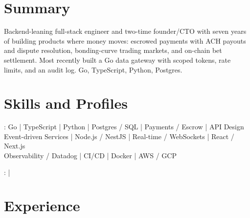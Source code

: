 \documentclass[print]{jack-resume}
\begin{document}
\pagecolor{darkmodeBackground}


\begin{minipage}[t][1cm][t]{.03\textwidth}
    \hfill
\end{minipage}

\section{Summary}
Backend-leaning full-stack engineer and two-time founder/CTO with seven years of building products where money moves: escrowed payments with ACH payouts and dispute resolution, bonding-curve trading markets, and on-chain bet settlement. Most recently built a Go data gateway with scoped tokens, rate limits, and an audit log. Go, TypeScript, Python, Postgres.
\sectionsep

\section{Skills and Profiles}
:
Go \hfill | \hfill
TypeScript \hfill | \hfill
Python \hfill | \hfill
Postgres / SQL \hfill | \hfill
Payments / Escrow \hfill | \hfill
API Design \\
\hspace{1.0cm} Event-driven Services \hfill | \hfill
Node.js / NestJS \hfill | \hfill
Real-time / WebSockets \hfill | \hfill
React / Next.js \\
\hspace{1.0cm} Observability / Datadog \hfill | \hfill
CI/CD \hfill | \hfill
Docker \hfill | \hfill
AWS / GCP \\

\raggedright{
    :
      \href{https://www.linkedin.com/in/jack-sturtevant/}{ \ExternalLink} |
     \href{https://github.com/jacksturt}{ \ExternalLink}}

\section{Experience}
\end{document}
